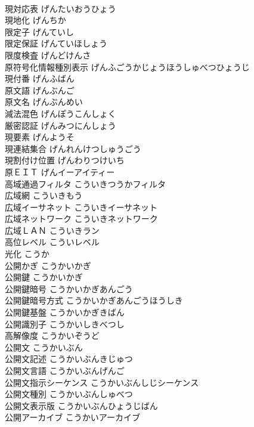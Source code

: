 \documentclass[8pt]{extreport}
\begin{document}
\begin{CJK}{UTF8}{min}
\\	現対応表	げんたいおうひょう	
\\	現地化	げんちか	
\\	限定子	げんていし	
\\	限定保証	げんていほしょう	
\\	限度検査	げんどけんさ	
\\	原符号化情報種別表示	げんふごうかじょうほうしゅべつひょうじ	
\\	現付番	げんふばん	
\\	原文語	げんぶんご	
\\	原文名	げんぶんめい	
\\	減法混色	げんぽうこんしょく	
\\	厳密認証	げんみつにんしょう	
\\	現要素	げんようそ	
\\	現連結集合	げんれんけつしゅうごう	
\\	現割付け位置	げんわりつけいち	
\\	原ＥＩＴ	げんイーアイティー	
\\	高域通過フィルタ	こういきつうかフィルタ	
\\	広域網	こういきもう	
\\	広域イーサネット	こういきイーサネット	
\\	広域ネットワーク	こういきネットワーク	
\\	広域ＬＡＮ	こういきラン	
\\	高位レベル	こういレベル	
\\	光化	こうか	
\\	公開かぎ	こうかいかぎ	
\\	公開鍵	こうかいかぎ	
\\	公開鍵暗号	こうかいかぎあんごう	
\\	公開鍵暗号方式	こうかいかぎあんごうほうしき	
\\	公開鍵基盤	こうかいかぎきばん	
\\	公開識別子	こうかいしきべつし	
\\	高解像度	こうかいぞうど	
\\	公開文	こうかいぶん	
\\	公開文記述	こうかいぶんきじゅつ	
\\	公開文言語	こうかいぶんげんご	
\\	公開文指示シーケンス	こうかいぶんしじシーケンス	
\\	公開文種別	こうかいぶんしゅべつ	
\\	公開文表示版	こうかいぶんひょうじばん	
\\	公開アーカイブ	こうかいアーカイブ	

\end{CJK}
\end{document}
